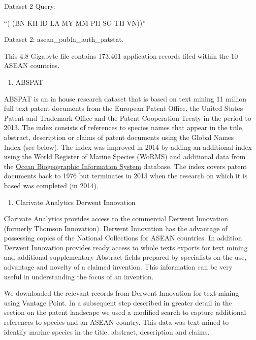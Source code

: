 \documentclass[]{book}
\providecommand{\tightlist}{%
  \setlength{\itemsep}{0pt}\setlength{\parskip}{0pt}}
\theoremstyle{definition}
\theoremstyle{definition}
\theoremstyle{definition}
\theoremstyle{remark}
\begin{document}
Dataset 2 Query:

``(\citet{PubAuthority} (BN \textbar{} KH \textbar{} ID \textbar{} LA
\textbar{} MY \textbar{} MM \textbar{} PH \textbar{} SG \textbar{} TH
\textbar{} VN))''

Dataset 2: asean\_publn\_auth\_patstat.

This 4.8 Gigabyte file contains 173,461 application records filed within
the 10 ASEAN countries.

\begin{enumerate}
\def\labelenumi{\arabic{enumi}.}
\setcounter{enumi}{1}
\tightlist
\item
  ABSPAT
\end{enumerate}

ABSPAT is an in house research dataset that is based on text mining 11
million full text patent documents from the European Patent Office, the
United States Patent and Trademark Office and the Patent Cooperation
Treaty in the period to 2013. The index consists of references to
species names that appear in the title, abstract, description or claims
of patent documents using the Global Names Index (see below). The index
was improved in 2014 by adding an additional index using the World
Register of Marine Species (WoRMS) and additional data from the
\href{http://www.iobis.org/}{Ocean Biogeographic Information System}
database. The index covers patent documents back to 1976 but terminates
in 2013 when the research on which it is based was completed (in 2014).

\begin{enumerate}
\def\labelenumi{\arabic{enumi}.}
\setcounter{enumi}{2}
\tightlist
\item
  Clarivate Analytics Derwent Innovation
\end{enumerate}

Clarivate Analytics provides access to the commercial Derwent Innovation
(formerly Thomson Innovation). Derwent Innovation has the advantage of
possessing copies of the National Collections for ASEAN countries. In
addition Derwent Innovation provides ready access to whole texts exports
for text mining and additional supplementary Abstract fields prepared by
specialists on the use, advantage and novelty of a claimed invention.
This information can be very useful in understanding the focus of an
invention.

We downloaded the relevant records from Derwent Innovation for text
mining using Vantage Point. In a subsequent step described in greater
detail in the section on the patent landscape we used a modified search
to capture additional references to species and an ASEAN country. This
data was text mined to identify marine species in the title, abstract,
description and claims.
\end{document}
